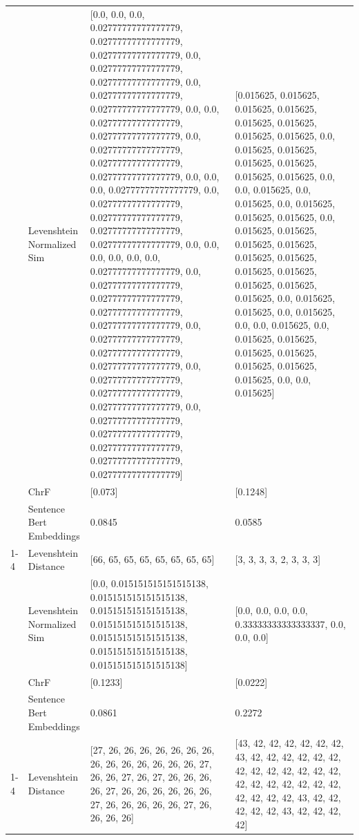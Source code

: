 \begin{tabular}{llll}
 & Levenshtein Normalized Sim & [0.0, 0.0, 0.0, 0.02777777777777779, 0.02777777777777779, 0.02777777777777779, 0.0, 0.02777777777777779, 0.02777777777777779, 0.0, 0.02777777777777779, 0.02777777777777779, 0.0, 0.0, 0.02777777777777779, 0.02777777777777779, 0.0, 0.02777777777777779, 0.02777777777777779, 0.02777777777777779, 0.0, 0.0, 0.0, 0.02777777777777779, 0.0, 0.02777777777777779, 0.02777777777777779, 0.02777777777777779, 0.02777777777777779, 0.0, 0.0, 0.0, 0.0, 0.0, 0.0, 0.02777777777777779, 0.0, 0.02777777777777779, 0.02777777777777779, 0.02777777777777779, 0.02777777777777779, 0.0, 0.02777777777777779, 0.02777777777777779, 0.02777777777777779, 0.0, 0.02777777777777779, 0.02777777777777779, 0.02777777777777779, 0.0, 0.02777777777777779, 0.02777777777777779, 0.02777777777777779, 0.02777777777777779, 0.02777777777777779] & [0.015625, 0.015625, 0.015625, 0.015625, 0.015625, 0.015625, 0.015625, 0.015625, 0.0, 0.015625, 0.015625, 0.015625, 0.015625, 0.015625, 0.015625, 0.0, 0.0, 0.015625, 0.0, 0.015625, 0.0, 0.015625, 0.015625, 0.015625, 0.0, 0.015625, 0.015625, 0.015625, 0.015625, 0.015625, 0.015625, 0.015625, 0.015625, 0.015625, 0.015625, 0.015625, 0.0, 0.015625, 0.015625, 0.0, 0.015625, 0.0, 0.0, 0.015625, 0.0, 0.015625, 0.015625, 0.015625, 0.015625, 0.015625, 0.015625, 0.015625, 0.0, 0.0, 0.015625] \\
 & ChrF & [0.073] & [0.1248] \\
 & Sentence Bert Embeddings & 0.0845 & 0.0585 \\
\cline{1-4}
\multirow[t]{4}{*}{Abakadde bali mu gandaalo mu kisikiziz kyomuti.} & Levenshtein Distance & [66, 65, 65, 65, 65, 65, 65, 65] & [3, 3, 3, 3, 2, 3, 3, 3] \\
 & Levenshtein Normalized Sim & [0.0, 0.015151515151515138, 0.015151515151515138, 0.015151515151515138, 0.015151515151515138, 0.015151515151515138, 0.015151515151515138, 0.015151515151515138] & [0.0, 0.0, 0.0, 0.0, 0.33333333333333337, 0.0, 0.0, 0.0] \\
 & ChrF & [0.1233] & [0.0222] \\
 & Sentence Bert Embeddings & 0.0861 & 0.2272 \\
\cline{1-4}
\multirow[t]{4}{*}{Addukana yanoonya akuyu.} & Levenshtein Distance & [27, 26, 26, 26, 26, 26, 26, 26, 26, 26, 26, 26, 26, 26, 26, 27, 26, 26, 27, 26, 27, 26, 26, 26, 26, 27, 26, 26, 26, 26, 26, 26, 27, 26, 26, 26, 26, 26, 27, 26, 26, 26, 26] & [43, 42, 42, 42, 42, 42, 42, 43, 42, 42, 42, 42, 42, 42, 42, 42, 42, 42, 42, 42, 42, 42, 42, 42, 42, 42, 42, 42, 42, 42, 42, 42, 43, 42, 42, 42, 42, 42, 43, 42, 42, 42, 42] \\

\end{tabular}
